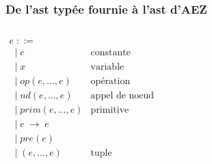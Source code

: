 \documentclass[18pt]{beamer}
\begin{document}
\begin{frame}
\frametitle{De l'ast typée fournie à l'ast d'AEZ}
	
	\begin{columns}[T]
		\begin{column}{.5\linewidth}
			$
			\begin{array}{lll}
				e\;::=&
				\\
					\;\;| \; c	
				&	\text{constante}
				\\
					\;\;| \; x	
				&	\text{variable}
				\\
					\;\;| \; op(e,...,e)
				&	\text{opération}
				\\
					\;\;| \; nd(e,...,e)
				&	\text{appel de noeud}
				\\
					\;\;| \; prim(e,...,e)
				&	\text{primitive}
				\\
					\;\;| \; e\;\rightarrow\;e
				&	%
				\\
					\;\;| \; pre(e)
				&	%
				\\
					\;\;| \; (e,...,e)
				&	\text{tuple}
			\end{array}
			$	
		
		\end{column}
		\begin{column}{.5\linewidth}
		
			
			
			\def\tmpcolor{gray}
			\def\newcolor{teal}
			\def\oldcolor{purple}
			

\end{column}
\end{columns}
\end{frame}
\end{document}
